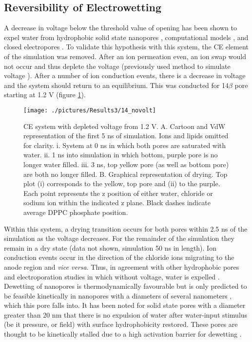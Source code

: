 \subsection*{Reversibility of Electrowetting}

A decrease in voltage below the threshold value of opening has been shown to expel water from hydrophobic solid state nanopores \cite{Powell2011}, computational models \cite{Vanzo2015x}, and closed electropores \cite{Vernier2006,Delemotte2012,Hu2013c}. To validate this hypothesis with this system, the CE element of the simulation was removed. After an ion permeation even, an ion swap would not occur and thus deplete the voltage (previously used method to simulate voltage \cite{Dzubiella2003x,Vernier2006}). After a number of ion conduction events, there is a decrease in voltage and the system should return to an equilibrium. This was conducted for 14$\beta$ pore starting at 1.2 V (figure \ref{fig:14_novolt}). 


\begin{figure}[H]
\begin{center}
\texttt{[image: ./pictures/Results3/14\_novolt]}
\caption[CE system with depleted voltage from 1.2 V.] {CE system with depleted voltage from 1.2 V. A. Cartoon and VdW representation of the first 5 ns of simulation. Ions and lipids omitted for clarity. i. System at 0 ns in which both pores are saturated with water. ii. 1 ns into simulation in which bottom, purple pore is no longer water filled. iii. 3 ns, top yellow pore (as well as bottom pore) are both no longer filled. B. Graphical representation of drying. Top plot (i) corresponds to the yellow, top pore and (ii) to the purple. Each point represents the z position of either water, chloride or sodium ion within the indicated z plane. Black dashes indicate average DPPC phosphate position.}
\label{fig:14_novolt}
\end{center}
\end{figure}  

Within this system, a drying transition occurs for both pores within 2.5 ns of the simulation as the voltage decreases. For the remainder of the simulation they remain in a dry state (data not shown, simulation 50 ns in length). Ion conduction events occur in the direction of the chloride ions migrating to the anode region and \textit{vice versa}. Thus, in agreement with other hydrophobic pores and electroporation studies in which without voltage, water is expelled \cite{Vernier2006a,Powell2011}. Dewetting of nanopores is thermodynamically favourable but is only predicted to be feasible kinetically in nanopores with a diameters of several nanometers \cite{Leung2003,Hummer2001,Beckstein2003}, which this pore falls into. It has been noted for solid state pores with a diameter greater than 20 nm that there is no expulsion of water after water-input stimulus (be it pressure, or field) with surface hydrophobicity restored. These pores are thought to be kinetically stalled due to a high activation barrier for dewetting \cite{Smirnov2010,Lum1998,Lum1997,Luzar2004,Lee1984,Smirnov2011}.

